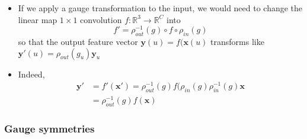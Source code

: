 \documentclass[12pt]{article}
\numberwithin{equation}{section}
\theoremstyle{definition}
\newcommand{		\eq		}[1]	{	\begin{align*}#1\end{align*}	}%
\newcommand{		\1		}	{	\bm{1}					}%
\begin{document}
\begin{mdframed}
\begin{itemize}
\item If we apply a gauge transformation to the input, we would need to change the linear map $1 \times 1$ convolution $f: \mathbb{R}^3 \to \mathbb{R}^C$ into
$$
f' = \rho_{out}^{-1} (g) \circ f \circ \rho_{in} (g)
$$
so that the output feature vector $\mathbf{y}(u) = f(\mathbf{x}(u)$ transforms like $\mathbf{y}'(u) = \rho_{out} (g_u) \mathbf{y}_u$
\item Indeed,
\eq{
\mathbf{y}' &= f'(\mathbf{x}') = \rho_{out}^{-1} (g) f ( \rho_{in} (g) \rho_{in}^{-1}(g) \mathbf{x} \\
&= \rho_{out}^{-1}(g) f(\mathbf{x})
}
\end{itemize} 
\end{mdframed}


\subsubsection*{ Gauge symmetries } 
\end{document}
